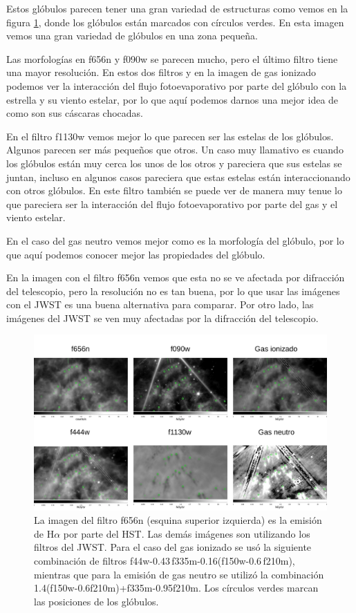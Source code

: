 \documentclass{book}
\begin{document}
Estos glóbulos parecen tener una gran variedad de estructuras como vemos en la figura \ref{fig:filters WR124}, donde los glóbulos están marcados con círculos verdes. En esta imagen vemos una gran variedad de glóbulos en una zona pequeña.

Las morfologías en f656n y f090w se parecen mucho, pero el último filtro tiene una mayor resolución. En estos dos filtros y en la imagen de gas ionizado podemos ver la interacción del flujo fotoevaporativo por parte del glóbulo con la estrella y su viento estelar, por lo que aquí podemos darnos una mejor idea de como son sus cáscaras chocadas.

En el filtro f1130w vemos mejor lo que parecen ser las estelas de los glóbulos. Algunos parecen ser más pequeños que otros. Un caso muy llamativo es cuando los glóbulos están muy cerca los unos de los otros y pareciera que sus estelas se juntan, incluso en algunos casos pareciera que estas estelas están interaccionando con otros glóbulos. En este filtro también se puede ver de manera muy tenue lo que pareciera ser la interacción del flujo fotoevaporativo por parte del gas y el viento estelar.

En el caso del gas neutro vemos mejor como es la morfología del glóbulo, por lo que aquí podemos conocer mejor las propiedades del glóbulo.

En la imagen con el filtro f656n vemos que esta no se ve afectada por difracción del telescopio, pero la resolución no es tan buena, por lo que usar las imágenes con el JWST es una buena alternativa para comparar. Por otro lado, las imágenes del JWST se ven muy afectadas por la difracción del telescopio. 

\begin{figure}[htb]
    \centering
    \includegraphics[width=\textwidth]{Nuevas imagenes finales/C3_filter_1.pdf}
    \caption{La imagen del filtro f656n (esquina superior izquierda) es la emisión de H$\alpha$ por parte del HST. Las demás imágenes son utilizando los filtros del JWST. Para el caso del gas ionizado se usó la siguiente combinación de filtros f44w-0.43\,f335m-0.16(f150w-0.6\,f210m), mientras que para la emisión de gas neutro se utilizó la combinación 1.4(f150w-0.6\;f210m)+f335m-0.95\;f210m. Los círculos verdes marcan las posiciones de los glóbulos.}
    \label{fig:filters WR124}
\end{figure}
\end{document}
